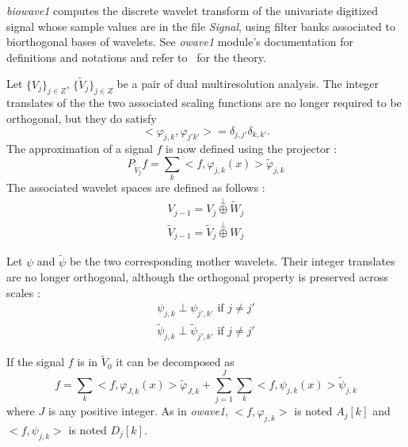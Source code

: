 {\em biowave1} computes the discrete wavelet transform of the univariate digitized signal whose sample values are in the file {\em Signal}, using filter banks associated to biorthogonal bases of wavelets. See {\em owave1} module's documentation for definitions and notations and 
refer to~\cite{cohen.daubechies.ea:biorthogonal} for the theory.

Let \( \{V_{j}\}_{j \in Z} \), \( \{\tilde{V}_{j}\}_{j \in Z} \) be a pair of dual multiresolution analysis. The integer translates of the the two associated scaling functions are no longer required to be orthogonal, but they do satisfy
\[
<\varphi_{j,k},\varphi_{j'k'}> = \delta_{j,j'} \delta_{k,k'}.
\]
The approximation of a signal $f$ is now defined using the projector :
\[
P_{\tilde{V}_{j}} f = \sum_{k} < f, \varphi_{j,k} (x)> \tilde{\varphi}_{j,k}
\]
The associated wavelet spaces are defined as follows :
\begin{eqnarray*}
V_{j-1} = V_{j} \stackrel{\perp}{\oplus} \tilde{W}_{j} \\
\tilde{V}_{j-1} = \tilde{V}_{j} \stackrel{\perp}{\oplus} W_{j}
\end{eqnarray*}

Let $\psi$ and $\tilde{\psi}$ be the two corresponding mother wavelets. Their integer translates are no longer orthogonal, although the orthogonal property is preserved across scales :
\begin{eqnarray*}
\psi_{j,k} \perp \psi_{j',k'}  \mbox{ if } j \neq j' \\
\tilde{\psi}_{j,k} \perp \tilde{\psi}_{j',k'}  \mbox{ if } j \neq j'
\end{eqnarray*}

If the signal $f$ is in $\tilde{V}_{0}$ it can be decomposed as 
\[
f = \sum_{k} < f, \varphi_{J,k} (x)> \tilde{\varphi}_{J,k} + \sum_{j=1}^{J} \sum_{k} < f, \psi_{j,k} (x)> \tilde{\psi}_{j,k}
\]
where $J$ is any positive integer.
As in {\em owave1}, $<f,\varphi_{j,k}>$ is noted $A_{j}[k]$ and $<f,\psi_{j,k}>$ is noted $D_{j}[k]$. 

